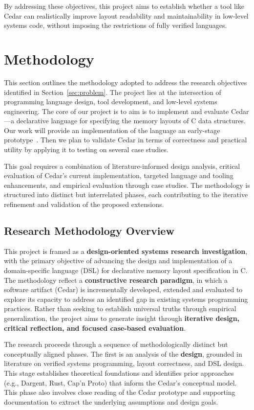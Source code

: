 \documentclass[12pt]{article}
\begin{document}
By addressing these objectives, this project aims to establish whether a tool
like Cedar can realistically improve layout readability and maintainability in
low-level systems code, without imposing the restrictions of fully
verified languages. 
\section{Methodology}
This section outlines the methodology adopted to address the research
objectives identified in Section~\ref{sec:problem}. The project lies at the intersection
of programming language design, tool development, and low-level systems
engineering. The core of our project is to aim is to implement and evaluate Cedar---a 
declarative language for specifying the memory layouts of C data structures. Our work 
will provide an implementation of the language
an early-stage prototype~\autocite{cedar_george}. Then we plan to validate Cedar in terms of 
correctness and practical utility by applying it to testing on several case studies. 

This goal requires a combination of literature-informed design analysis, critical evaluation of
Cedar's current implementation, targeted language and tooling enhancements,
and empirical evaluation through case studies. The methodology is structured
into distinct but interrelated phases, each contributing to the iterative
refinement and validation of the proposed extensions. 

\subsection{Research Methodology Overview}
This project is framed as a \textbf{design-oriented systems research
investigation}, with the primary objective of advancing the design and
implementation of a domain-specific language (DSL) for declarative memory
layout specification in C. The methodology reflect a \textbf{constructive
research paradigm}, in which a software artifact (Cedar) is incrementally
developed, extended and evaluated to explore its capacity to address an
identified gap in existing systems programming practices. Rather than
seeking to establish universal truths through empirical generalization, the
project aims to generate insight through \textbf{iterative design, critical
reflection, and focused case-based evaluation}.

The research proceeds through a sequence of methodologically distinct but
conceptually aligned phases. The first is an analysis of the \textbf{design},
grounded in literature on verified systems programming, layout correctness, and
DSL design. This stage establishes theoretical foundations and identifies
prior approaches (e.g., Dargent, Rust, Cap'n Proto) that inform the Cedar's
conceptual model. This phase also involves close reading of the Cedar prototype
and supporting documentation to extract the underlying assumptions and design
goals.
\end{document}
